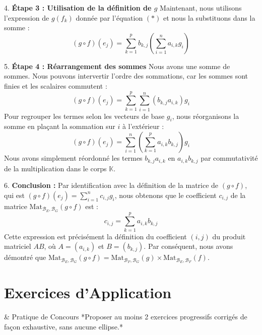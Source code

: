 \documentclass[12pt,a4paper]{report}
\begin{document}
4.  \textbf{Étape 3 : Utilisation de la définition de $g$}
    Maintenant, nous utilisons l'expression de $g(f_k)$ donnée par l'équation $(*)$ et nous la substituons dans la somme :
    $$(g \circ f)(e_j) = \sum_{k=1}^p b_{k,j} \left(\sum_{i=1}^n a_{i,k} g_i\right)$$

5.  \textbf{Étape 4 : Réarrangement des sommes}
    Nous avons une somme de sommes. Nous pouvons intervertir l'ordre des sommations, car les sommes sont finies et les scalaires commutent :
    $$(g \circ f)(e_j) = \sum_{k=1}^p \sum_{i=1}^n (b_{k,j} a_{i,k}) g_i$$
    Pour regrouper les termes selon les vecteurs de base $g_i$, nous réorganisons la somme en plaçant la sommation sur $i$ à l'extérieur :
    $$(g \circ f)(e_j) = \sum_{i=1}^n \left(\sum_{k=1}^p a_{i,k} b_{k,j}\right) g_i$$
    Nous avons simplement réordonné les termes $b_{k,j} a_{i,k}$ en $a_{i,k} b_{k,j}$ par commutativité de la multiplication dans le corps $\mathbb{K}$.

6.  \textbf{Conclusion :}
    Par identification avec la définition de la matrice de $(g \circ f)$, qui est $(g \circ f)(e_j) = \sum_{i=1}^n c_{i,j} g_i$, nous obtenons que le coefficient $c_{i,j}$ de la matrice $\text{Mat}_{\mathcal{B}_E, \mathcal{B}_G}(g \circ f)$ est :
    $$c_{i,j} = \sum_{k=1}^p a_{i,k} b_{k,j}$$
    Cette expression est précisément la définition du coefficient $(i,j)$ du produit matriciel $AB$, où $A = (a_{i,k})$ et $B = (b_{k,j})$.
    Par conséquent, nous avons démontré que $\text{Mat}_{\mathcal{B}_E, \mathcal{B}_G}(g \circ f) = \text{Mat}_{\mathcal{B}_F, \mathcal{B}_G}(g) \times \text{Mat}_{\mathcal{B}_E, \mathcal{B}_F}(f)$.

\section{Exercices d'Application} & Pratique de Concours
*Proposer au moins 2 exercices progressifs corrigés de façon exhaustive, sans aucune ellipse.*
\end{document}
